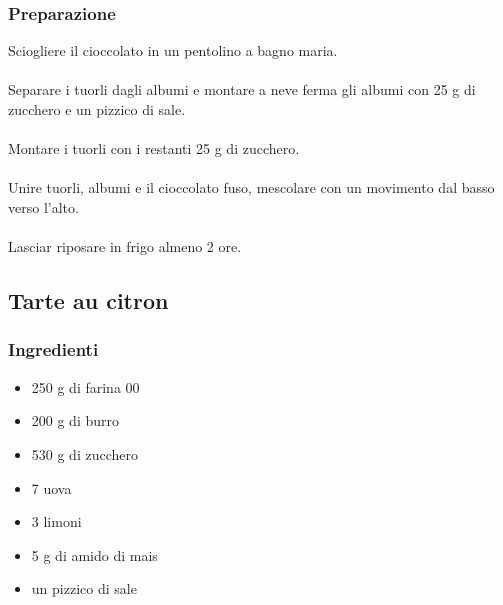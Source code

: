 \documentclass[12pt, a4paper]{article}
\begin{document}
\subsubsection{Preparazione}
	Sciogliere il cioccolato in un pentolino a bagno maria.\\\\
	Separare i tuorli dagli albumi e montare a neve ferma gli albumi con 25 g di
	zucchero e un pizzico di sale.\\\\
	Montare i tuorli con i restanti 25 g di zucchero.\\\\
	Unire tuorli, albumi e il cioccolato fuso, mescolare con un movimento dal basso verso l'alto.\\\\
	Lasciar riposare in frigo almeno 2 ore.
\clearpage

\subsection{Tarte au citron}

\subsubsection{Ingredienti}
\begin{itemize}
\item   250 g di farina 00
\item	200 g di burro
\item	530 g di zucchero
\item	7 uova
\item	3 limoni
\item	5 g di amido di mais
\item	un pizzico di sale
\end{itemize}
\end{document}
